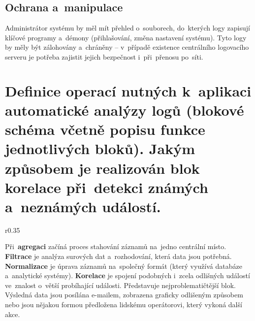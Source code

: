 \subsection{Ochrana a~manipulace}

Administrátor systému by měl mít přehled o~souborech, do~kterých logy zapisují klíčové programy a~démony (přihlašování, změna nastavení systému). Tyto logy by měly být zálohovány a~chráněny -- v~případě existence centrálního logovacího serveru je potřeba zajistit jejich bezpečnost i~při~přenosu po~síti.

\clearpage
\section{Definice operací nutných k~aplikaci automatické analýzy logů (blokové schéma včetně popisu funkce jednotlivých bloků). Jakým způsobem je realizován blok korelace při~detekci známých a~neznámých událostí.}

\begin{wrapfigure}{r}{0.35\textwidth}
\end{wrapfigure}

Při~\textbf{agregaci} začíná proces stahování záznamů na~jedno centrální místo. \textbf{Filtrace} je analýza surových dat a~rozhodování, která data jsou potřebná. \textbf{Normalizace} je úprava záznamů na~společný formát (který využívá databáze a~analytické systémy). \textbf{Korelace} je spojení podobných i~zcela odlišných událostí ve~znalost o~větší probíhající události. Představuje nejproblematičtější blok. Výsledná data jsou posílána e-mailem, zobrazena graficky odlišeným způsobem nebo jsou nějakou formou předložena lidskému operátorovi, který vykoná další akce.

